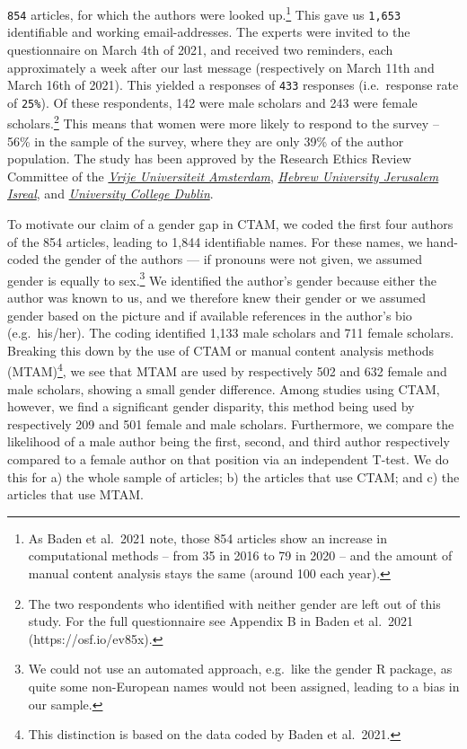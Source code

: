 \documentclass[
]{ccr}
\begin{document}
\texttt{854} articles, for which the authors were looked up.\footnote{As
  Baden et al.~2021 note, those 854 articles show an increase in
  computational methods -- from 35 in 2016 to 79 in 2020 -- and the
  amount of manual content analysis stays the same (around 100 each
  year).} This gave us \texttt{1,653} identifiable and working
email-addresses. The experts were invited to the questionnaire on March
4th of 2021, and received two reminders, each approximately a week after
our last message (respectively on March 11th and March 16th of 2021).
This yielded a responses of \texttt{433} responses (i.e.~response rate
of \texttt{25\%}). Of these respondents, 142 were male scholars and 243
were female scholars.\footnote{The two respondents who identified with
  neither gender are left out of this study. For the full questionnaire
  see Appendix B in Baden et al.~2021 (https://osf.io/ev85x).} This
means that women were more likely to respond to the survey -- 56\% in
the sample of the survey, where they are only 39\% of the author
population. The study has been approved by the Research Ethics Review
Committee of the \protect\hyperlink{}{\emph{Vrije Universiteit
Amsterdam}}, \protect\hyperlink{}{\emph{Hebrew University Jerusalem
Isreal}}, and \protect\hyperlink{}{\emph{University College Dublin}}.

To motivate our claim of a gender gap in CTAM, we coded the first four
authors of the 854 articles, leading to 1,844 identifiable names. For
these names, we hand-coded the gender of the authors --- if pronouns
were not given, we assumed gender is equally to sex.\footnote{We could
  not use an automated approach, e.g.~like the gender R package, as
  quite some non-European names would not been assigned, leading to a
  bias in our sample.} We identified the author's gender because either
the author was known to us, and we therefore knew their gender or we
assumed gender based on the picture and if available references in the
author's bio (e.g.~his/her). The coding identified 1,133 male scholars
and 711 female scholars. Breaking this down by the use of CTAM or manual
content analysis methods (MTAM)\footnote{This distinction is based on
  the data coded by Baden et al.~2021.}, we see that MTAM are used by
respectively 502 and 632 female and male scholars, showing a small
gender difference. Among studies using CTAM, however, we find a
significant gender disparity, this method being used by respectively 209
and 501 female and male scholars. Furthermore, we compare the likelihood
of a male author being the first, second, and third author respectively
compared to a female author on that position via an independent T-test.
We do this for a) the whole sample of articles; b) the articles that use
CTAM; and c) the articles that use MTAM.
\end{document}

